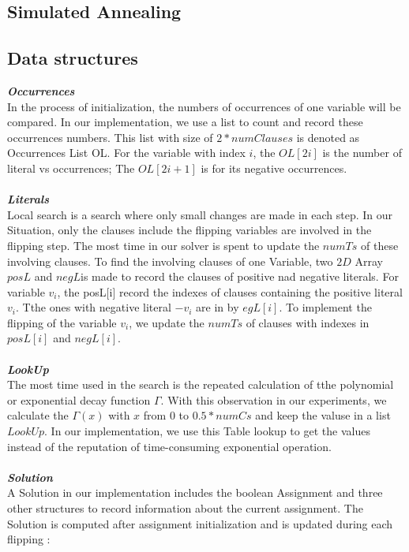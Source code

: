 \documentclass[12pt,a4paper,twoside]{scrartcl}
\numberwithin{equation}{section}
\begin{document}
\subsection{Simulated Annealing}
\label{sec:Simulated Annealing}
\subsection{Data structures}
\label{subsec:Data structures}
\emph{\textbf{ Occurrences}}
\\
In the process of initialization, the numbers of occurrences of one variable will be compared. In our implementation, we use a list to count and record these occurrences numbers. This list with size of $2*numClauses $ is denoted as Occurrences List OL. For the variable with index $i$, the $OL[2i]$ is the number of literal vs occurrences; The $OL[2i+1]$ is for its negative occurrences. \\
\\
\emph{\textbf{ Literals}}
\\
Local search is a search where only small changes are made in each step. In our Situation, only the clauses include the flipping variables are involved in the flipping step. The most time in our solver is spent to update the $numTs$ of these involving clauses. To find the involving clauses of one Variable,  two $2D$ Array $posL$ and $negL$is made to record the clauses of positive nad negative literals. For variable $v_i $, the posL[i] record the indexes of clauses containing the positive literal $v_i$. Tthe ones with negative literal $-v_i$ are in by $egL[i]$. To implement the flipping of the variable $v_i$, we update the $numTs$ of clauses with indexes in $posL[i]$ and $negL[i]$.\\
\\
\emph{\textbf{LookUp}}
\\
The most time used in the search is the repeated  calculation  of  tthe polynomial or exponential decay function $\Gamma$. With this observation in our experiments, we calculate the $\Gamma(x)$ with $x$ from $0$ to $0.5* numCs$ and keep the valuse in a list $LookUp$. In our implementation, we use this Table lookup to get the values instead of the reputation of time-consuming exponential operation.  \\
\\
\emph{\textbf{Solution}}
\\
A Solution in our implementation includes the boolean Assignment and three other structures to record information about the current assignment. The Solution is computed after assignment initialization and is updated during each flipping :\\
\end{document}

